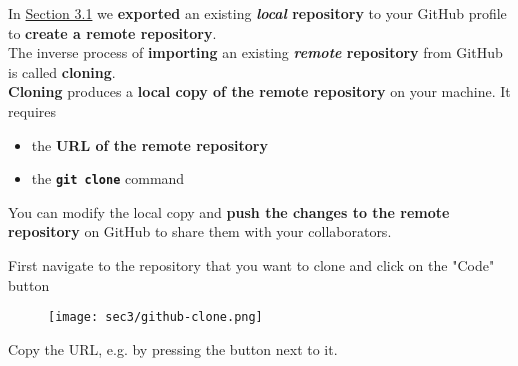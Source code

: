\begin{frame}[fragile]
\emptyframetitle

  In \hyperlink{sec3.1}{Section 3.1} we \textbf{exported} an existing \textbf{\textit{local} repository} to your GitHub profile to \textbf{create a remote repository}.\\[0.35cm]

  The inverse process of \textbf{importing} an existing \textbf{\textit{remote} repository} from GitHub is called \textbf{cloning}.\\[0.35cm]

  \textbf{Cloning} produces a \textbf{local copy of the remote repository} on your machine. It requires 
  \begin{itemize}
    \item the \textbf{URL of the remote repository}
    \item the \textbf{\texttt{git clone}} command\\[0.35cm]
  \end{itemize}

  You can modify the local copy and \textbf{push the changes to the remote repository} on GitHub to share them with your collaborators. 
   
\end{frame}


\begin{frame}[fragile]
\emptyframetitle

  First navigate to the repository that you want to clone and click on the "Code" button

  \begin{figure}[h]
    \texttt{[image: sec3/github-clone.png]}
  \end{figure}

  Copy the URL, e.g. by pressing the button next to it.

\end{frame}


